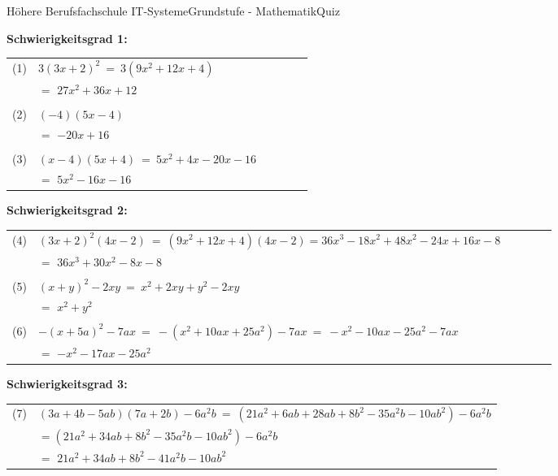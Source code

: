 \documentclass[oneside,openany,headings=optiontotoc,11pt,numbers=noenddot]{scrreprt}
\begin{document}
	\begin{worksheet}{Höhere Berufsfachschule IT-Systeme}{Grundstufe - Mathematik}{Quiz}
		\begin{framed}
			\textbf{Schwierigkeitsgrad 1:}\\
			\begin{tabularx}{\textwidth}{lXlXlX}
				\\
				(1) & \(3(3x+2)^2\ =\ 3(9x^2 + 12x +4)\)\\
				& \(=\) \underline{\(27x^2 + 36x +12\)}\\
				\\
				(2) & \((-4)(5x-4)\)\\
				& \(=\) \underline{\(-20x +16\)}\\
				\\
				(3) & \((x-4)(5x+4)\ =\ 5x^2 +4x -20x -16\)\\
				& \(=\) \underline{\(5x^2 - 16x -16\)}\\
			\end{tabularx}
			\par\bigskip\noindent
			\textbf{Schwierigkeitsgrad 2:}\\
			\begin{tabularx}{\textwidth}{lXlXlX}
				\\
				(4) & \((3x+2)^2(4x-2)\ =\ (9x^2 +12x +4)(4x-2) = 36x^3 -18x^2 + 48x^2 -24x +16x -8\)\\
				& \(=\) \underline{\(36x^3 +30x^2 -8x -8\)}\\
				\\
				(5) & \((x+y)^2 -2xy\ =\ x^2 + 2xy + y^2 -2xy\)\\
				& \(=\) \underline{\(x^2 + y^2\)}\\
				\\
				(6) & \(-(x+5a)^2-7ax\ =\ -(x^2 +10ax +25a^2)-7ax\ =\ -x^2 -10ax -25a^2 -7ax\)\\
				& \(=\) \underline{\(-x^2 -17ax -25a^2\)}\\
			\end{tabularx}
			\par\bigskip\noindent
			\textbf{Schwierigkeitsgrad 3:}\\
			\begin{tabularx}{\textwidth}{lX}
				\\
				(7) & \((3a + 4b -5ab)(7a+2b)-6a^2b\ =\ (21a^2 +6ab + 28ab + 8b^2 - 35a^2b - 10ab^2) - 6a^2b\)\\
				& \(= (21a^2 +34ab +8b^2 -35a^2b -10ab^2) - 6a^2b\)\\
				& \(=\) \underline{\(21a^2 +34ab + 8b^2 - 41a^2b -10ab^2\)}\\

\end{tabularx}
\end{framed}
\end{worksheet}
\end{document}
